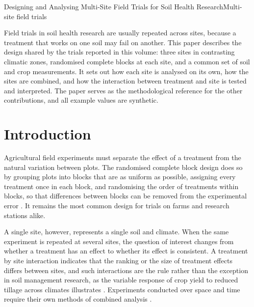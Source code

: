 \documentclass[../main.tex]{subfiles}
\begin{document}
\begin{paper}{Designing and Analysing Multi-Site Field Trials for Soil Health Research}{Multi-site field trials}
\label{paper:trials}

\begin{paperabstract}
Field trials in soil health research are usually repeated across sites,
because a treatment that works on one soil may fail on another. This paper
describes the design shared by the trials reported in this volume: three
sites in contrasting climatic zones, randomised complete blocks at each site,
and a common set of soil and crop measurements. It sets out how each site is
analysed on its own, how the sites are combined, and how the interaction
between treatment and site is tested and interpreted. The paper serves as the
methodological reference for the other contributions, and all example values
are synthetic.
\end{paperabstract}

\section{Introduction}

Agricultural field experiments must separate the effect of a treatment from
the natural variation between plots. The randomised complete block design
does so by grouping plots into blocks that are as uniform as possible,
assigning every treatment once in each block, and randomising the order of
treatments within blocks, so that differences between blocks can be removed
from the experimental error \parencite{gomez1984}. It remains the most common
design for trials on farms and research stations alike.

A single site, however, represents a single soil and climate. When the same
experiment is repeated at several sites, the question of interest changes
from whether a treatment has an effect to whether its effect is consistent.
A treatment by site interaction indicates that the ranking or the size of
treatment effects differs between sites, and such interactions are the rule
rather than the exception in soil management research, as the variable
response of crop yield to reduced tillage across climates illustrates
\parencite{pittelkow2015}. Experiments conducted over space and time require
their own methods of combined analysis \parencite{gomez1984}.


\end{paper}
\end{document}
